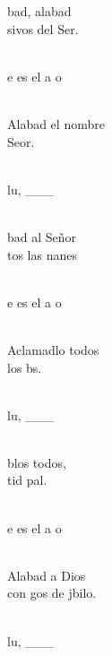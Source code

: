 \documentclass[12pt]{article}
\begin{document}
\begin{multicols*}{2}
\begin{cancion}
	bad, alabad\\
	sivos del Ser.\\\jump\\
	\begin{chorus}%
	e es el a  o \\
	\end{chorus}%
	\jump\\
Alabad el nombre \\
	 Seor.\\\jump\\
	\begin{chorus}%
	lu, ___\\
	\end{chorus}%
	\jump\\
	bad al Señor\\
	tos las nanes\\\jump\\
	\begin{chorus}%
	e es el a  o \\
	\end{chorus}%
	\jump\\
Aclamadlo todos\\
	los bs.\\\jump\\
	\begin{chorus}%
	lu, ___\\
	\end{chorus}%
	\jump\\
	blos todos,\\
	tid pal.\\\jump\\
	\begin{chorus}%
	e es el a  o \\
	\end{chorus}%
	\jump\\
Alabad a Dios\\
	con gos de jbilo.\\\jump\\
	\begin{chorus}%
	lu, ___\\
	\end{chorus}%
	\jump\\
\end{cancion}%


\end{multicols*}
\end{document}
